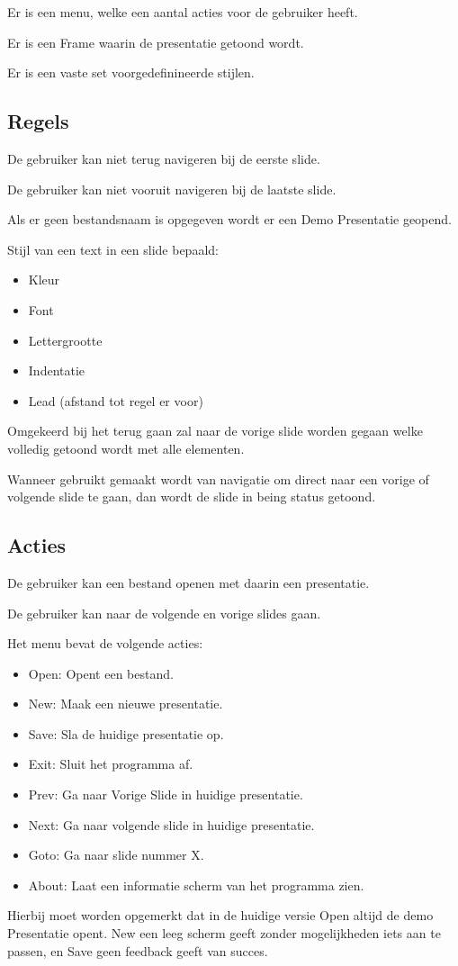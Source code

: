 \documentclass[a4paper]{article}
\begin{document}
Er is een menu, welke een aantal acties voor de gebruiker heeft.

Er is een Frame waarin de presentatie getoond wordt.

Er is een vaste set voorgedefinineerde stijlen.

\subsection{Regels}
De gebruiker kan niet terug navigeren bij de eerste slide.

De gebruiker kan niet vooruit navigeren bij de laatste slide.

Als er geen bestandsnaam is opgegeven wordt er een Demo Presentatie geopend.

Stijl van een text in een slide bepaald:
\begin{itemize}
    \item Kleur
    \item Font
    \item Lettergrootte
    \item Indentatie
    \item Lead (afstand tot regel er voor)
\end{itemize}

Omgekeerd bij het terug gaan zal naar de vorige slide worden gegaan welke
volledig getoond wordt met alle elementen.

Wanneer gebruikt gemaakt wordt van navigatie om direct naar een vorige of
volgende slide te gaan, dan wordt de slide in being status getoond.

\subsection{Acties}
De gebruiker kan een bestand openen met daarin een presentatie.

De gebruiker kan naar de volgende en vorige slides gaan.

Het menu bevat de volgende acties:
\begin{itemize}
    \item Open: Opent een bestand.
    \item New: Maak een nieuwe presentatie.
    \item Save: Sla de huidige presentatie op.
    \item Exit: Sluit het programma af.
    \item Prev: Ga naar Vorige Slide in huidige presentatie.
    \item Next: Ga naar volgende slide in huidige presentatie.
    \item Goto: Ga naar slide nummer X.
    \item About: Laat een informatie scherm van het programma zien.
\end{itemize}
Hierbij moet worden opgemerkt dat in de huidige versie Open altijd de demo
Presentatie opent. New een leeg scherm geeft zonder mogelijkheden iets aan te
passen, en Save geen feedback geeft van succes.
\end{document}
